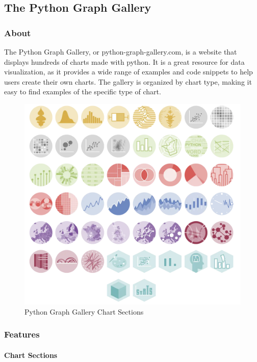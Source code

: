 \documentclass[
]{article}
\begin{document}
\subsection{The Python Graph Gallery}\label{the-python-graph-gallery}

\subsubsection{About}\label{about}

The Python Graph Gallery, or python-graph-gallery.com, is a website that
displays hundreds of charts made with python. It is a great resource for
data visualization, as it provides a wide range of examples and code
snippets to help users create their own charts. The gallery is organized
by chart type, making it easy to find examples of the specific type of
chart.

\begin{figure}
\centering
\includegraphics{python_gallery.png}
\caption{Python Graph Gallery Chart Sections}
\end{figure}

\subsubsection{Features}\label{features}

\paragraph{Chart Sections}\label{chart-sections}
\end{document}
